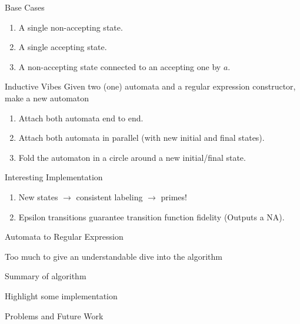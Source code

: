 \documentclass{beamer}
\begin{document}
\begin{frame}{Base Cases}
	\large
	\begin{enumerate}[]\item {} A single non-accepting state.
		\item {} A single accepting state. 
		\item {} A non-accepting state connected to an accepting one by $a$.
	\end{enumerate}
\end{frame}

\begin{frame}{Inductive Vibes}
	\large
	Given two (one) automata and a regular expression constructor, make a new automaton
	\begin{enumerate}[]
		\item {} Attach both automata end to end.
		\item {} Attach both automata in parallel (with new initial and final states).
		\item {} Fold the automaton in a circle around a new initial/final state.
	\end{enumerate}
\end{frame}

\begin{frame}{Interesting Implementation}
	\large
	\begin{enumerate}[]
		\item New states $\rightarrow$ consistent labeling $\rightarrow$ primes!
		\item Epsilon transitions guarantee transition function fidelity (Outputs a NA). 
		
	\end{enumerate}
\end{frame}

\begin{frame}{Automata to Regular Expression}
	\centering \Large
	
	Too much to give an understandable dive into the algorithm\vspace{5mm}
	
	Summary of algorithm\vspace{5mm}
	
	Highlight some implementation\vspace{5mm}
	
	Problems and Future Work
\end{frame}
\end{document}
